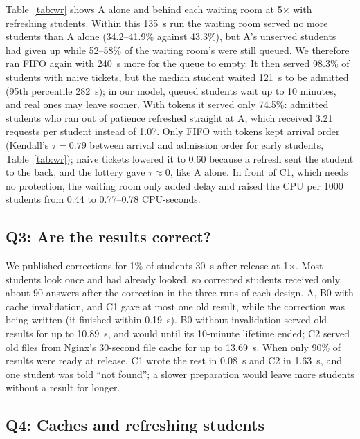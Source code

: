 

Table~\ref{tab:wr} shows A alone and behind each waiting room at 5$\times$
with refreshing students. Within this \SI{135}{s} run the waiting room served
no more students than A alone (34.2--41.9\% against 43.3\%), but A's
unserved students had given up while 52--58\% of the waiting room's were
still queued. We therefore ran FIFO again with \SI{240}{s} more for the queue
to empty. It then served 98.3\% of students with naive tickets, but the
median student waited \SI{121}{s} to be admitted (95th percentile
\SI{282}{s}); in our model, queued students wait up to 10 minutes, and real
ones may leave sooner. With tokens it served only 74.5\%: admitted students
who ran out of patience refreshed straight at A, which received 3.21 requests
per student instead of 1.07. Only FIFO with tokens kept arrival order
(Kendall's $\tau=0.79$ between arrival and admission order for early
students, Table~\ref{tab:wr}); naive tickets lowered it to 0.60 because a
refresh sent the student to the back, and the lottery gave $\tau\approx0$,
like A alone. In front of C1, which needs no protection, the waiting room only added
delay and raised the CPU per \num{1000} students from 0.44 to 0.77--0.78
CPU-seconds.

\subsection{Q3: Are the results correct?}
\label{sec:rq3}

We published corrections for 1\% of students \SI{30}{s} after release at
1$\times$. Most students look once and had already looked, so corrected
students received only about 90 answers after the correction in the three
runs of each design. A, B0 with cache invalidation, and C1 gave at most one
old result, while the correction was being written (it finished within
\SI{0.19}{s}). B0 without invalidation served old results for up to
\SI{10.89}{s}, and would until its 10-minute lifetime ended; C2 served old
files from Nginx's 30-second file cache for up to \SI{13.69}{s}. When only
90\% of results were ready at release, C1 wrote the rest in \SI{0.08}{s} and
C2 in \SI{1.63}{s}, and one student was told ``not found''; a slower
preparation would leave more students without a result for longer.

\subsection{Q4: Caches and refreshing students}
\label{sec:rq4}


